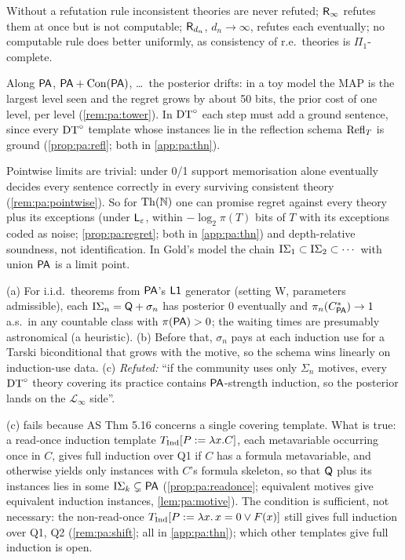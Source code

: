 \begin{proposition}[Refutation]\pabrk{}\label{prop:pa:refute}
Without a refutation rule inconsistent theories are never refuted; $\mathsf{R}_{\infty}$ refutes them at once but is not computable; $\mathsf{R}_{d_n}$, $d_n\to\infty$, refutes each eventually; no computable rule does better uniformly, as consistency of r.e.\ theories is $\Pi_1$-complete.
\end{proposition}

\noindent Along $\mathsf{PA}$, $\mathsf{PA}+\mathrm{Con}(\mathsf{PA})$, \dots\ the posterior drifts: in a toy model the MAP is the largest level seen and the regret grows by about 50 bits, the prior cost of one level, per level (\cref{rem:pa:tower}). In $\mathrm{DT}^{\circ}$ each step must add a ground sentence, since every $\mathrm{DT}^{\circ}$ template whose instances lie in the reflection schema $\mathrm{Refl}_T$ is ground (\cref{prop:pa:refl}; both in \cref{app:pa:thn}).

\noindent Pointwise limits are trivial: under 0/1 support memorisation alone eventually decides every sentence correctly in every surviving consistent theory (\cref{rem:pa:pointwise}). So for $\mathrm{Th}(\mathbb{N})$ one can promise regret against every theory plus its exceptions (under $\mathsf{L}_{\varepsilon}$, within $-\log_2\pi(T)$ bits of $T$ with its exceptions coded as noise; \cref{prop:pa:regret}; both in \cref{app:pa:thn}) and depth-relative soundness, not identification. In Gold's model the chain $\mathrm{I}\Sigma_{1}\subset\mathrm{I}\Sigma_{2}\subset\cdots$ with union $\mathsf{PA}$ is a limit point.

\begin{proposition}\pabrk{}\label{prop:pa:isigma}
(a) For i.i.d.\ theorems from $\mathsf{PA}$'s $\mathord{\mathsf{L1}}$ generator (setting W, parameters admissible), each $\mathrm{I}\Sigma_{n}=\mathsf{Q}+\sigma_n$ has posterior $0$ eventually and $\pi_n(C^{*}_{\mathsf{PA}})\to1$ a.s.\ in any countable class with $\pi(\mathsf{PA})>0$; the waiting times are presumably astronomical (a heuristic). (b) Before that, $\sigma_n$ pays at each induction use for a Tarski biconditional that grows with the motive, so the schema wins linearly on induction-use data. (c) \emph{Refuted:} ``if the community uses only $\Sigma_n$ motives, every $\mathrm{DT}^{\circ}$ theory covering its practice contains $\mathsf{PA}$-strength induction, so the posterior lands on the $\mathcal L_\infty$ side''.
\end{proposition}

\noindent (c) fails because AS Thm 5.16 concerns a single covering template. What is true: a read-once induction template $T_{\mathrm{Ind}}[P:=\lambda x.C]$, each metavariable occurring once in $C$, gives full induction over Q1 if $C$ has a formula metavariable, and otherwise yields only instances with $C$'s formula skeleton, so that $\mathsf{Q}$ plus its instances lies in some $\mathrm{I}\Sigma_{k}\subsetneq\mathsf{PA}$ (\cref{prop:pa:readonce}; equivalent motives give equivalent induction instances, \cref{lem:pa:motive}). The condition is sufficient, not necessary: the non-read-once $T_{\mathrm{Ind}}[P:=\lambda x.\,x=0\vee F(x)]$ still gives full induction over Q1, Q2 (\cref{rem:pa:shift}; all in \cref{app:pa:thn}); which other templates give full induction is open.

